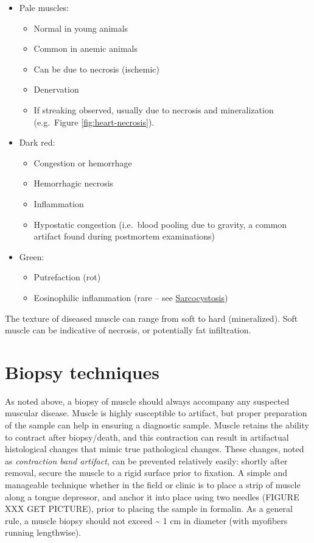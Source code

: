 \documentclass[openany]{book}
\providecommand{\tightlist}{%
  \setlength{\itemsep}{0pt}\setlength{\parskip}{0pt}}
\begin{document}
\begin{itemize}
\tightlist
\item
  Pale muscles:

  \begin{itemize}
  \tightlist
  \item
    Normal in young animals
  \item
    Common in anemic animals
  \item
    Can be due to necrosis (ischemic)
  \item
    Denervation
  \item
    If streaking observed, usually due to necrosis and mineralization
    (e.g.~Figure \ref{fig:heart-necrosis}).
  \end{itemize}
\item
  Dark red:

  \begin{itemize}
  \tightlist
  \item
    Congestion or hemorrhage
  \item
    Hemorrhagic necrosis
  \item
    Inflammation
  \item
    Hypostatic congestion (i.e.~blood pooling due to gravity, a common
    artifact found during postmortem examinations)
  \end{itemize}
\item
  Green:

  \begin{itemize}
  \tightlist
  \item
    Putrefaction (rot)
  \item
    Eosinophilic inflammation (rare -- see
    \protect\hyperlink{sarcocystosis}{Sarcocystosis})
  \end{itemize}
\end{itemize}

The texture of diseased muscle can range from soft to hard
(mineralized). Soft muscle can be indicative of necrosis, or potentially
fat infiltration.

\section{Biopsy techniques}\label{biopsy-techniques}

As noted above, a biopsy of muscle should always accompany any suspected
muscular disease. Muscle is highly susceptible to artifact, but proper
preparation of the sample can help in ensuring a diagnostic sample.
Muscle retains the ability to contract after biopsy/death, and this
contraction can result in artifactual histological changes that mimic
true pathological changes. These changes, noted as \emph{contraction
band artifact}, can be prevented relatively easily: shortly after
removal, secure the muscle to a rigid surface prior to fixation. A
simple and manageable technique whether in the field or clinic is to
place a strip of muscle along a tongue depressor, and anchor it into
place using two needles (FIGURE XXX GET PICTURE), prior to placing the
sample in formalin. As a general rule, a muscle biopsy should not exceed
\textasciitilde{} 1 cm in diameter (with myofibers running lengthwise).
\end{document}
